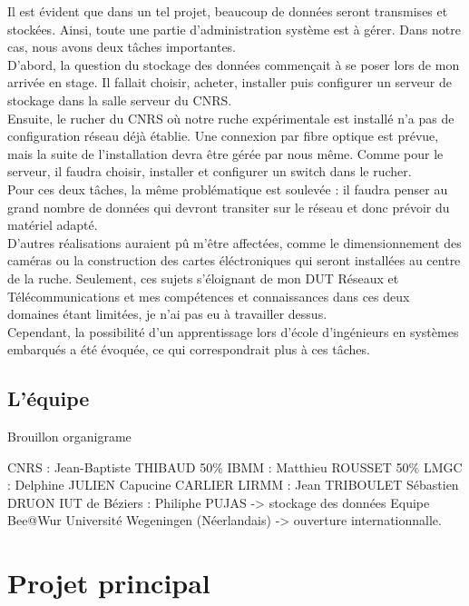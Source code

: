 \documentclass[11pt,french,a4paper]{report}
\begin{document}
Il est évident que dans un tel projet, beaucoup de données seront transmises et stockées. Ainsi, toute une partie d'administration 
système est à gérer. Dans notre cas, nous avons deux tâches importantes.\\
D'abord, la question du stockage des données commençait à se poser lors de mon arrivée en stage. Il fallait choisir, acheter, installer
puis configurer un serveur de stockage dans la salle serveur du CNRS.\\
Ensuite, le rucher du CNRS où notre ruche expérimentale est installé n'a pas de configuration réseau déjà établie. 
Une connexion par fibre optique est prévue, mais la suite de l'installation devra être gérée par nous même. Comme pour le serveur, 
il faudra choisir, installer et configurer un switch dans le rucher.\\
Pour ces deux tâches, la même problématique est soulevée : il faudra penser au grand nombre de données qui devront transiter sur le 
réseau et donc prévoir du matériel adapté.\\
D'autres réalisations auraient pû m'être affectées, comme le dimensionnement des caméras ou la construction des cartes éléctroniques
qui seront installées au centre de la ruche. Seulement, ces sujets s'éloignant de mon DUT Réseaux et Télécommunications et mes 
compétences et connaissances dans ces deux domaines étant limitées, je n'ai pas eu à travailler dessus.\\
Cependant, la possibilité d'un apprentissage lors d'école d'ingénieurs en systèmes embarqués a été évoquée, ce qui correspondrait 
plus à ces tâches.\\


\section{L'équipe}

Brouillon organigrame 

CNRS : Jean-Baptiste THIBAUD 50\%
IBMM : Matthieu ROUSSET 50\%
LMGC : Delphine JULIEN
       Capucine CARLIER
LIRMM : Jean TRIBOULET 
        Sébastien DRUON 
IUT de Béziers : Philiphe PUJAS -> stockage des données 
Equipe Bee@Wur Université Wegeningen (Néerlandais) -> ouverture internationnalle. 


\chapter{Projet principal}
\end{document}
